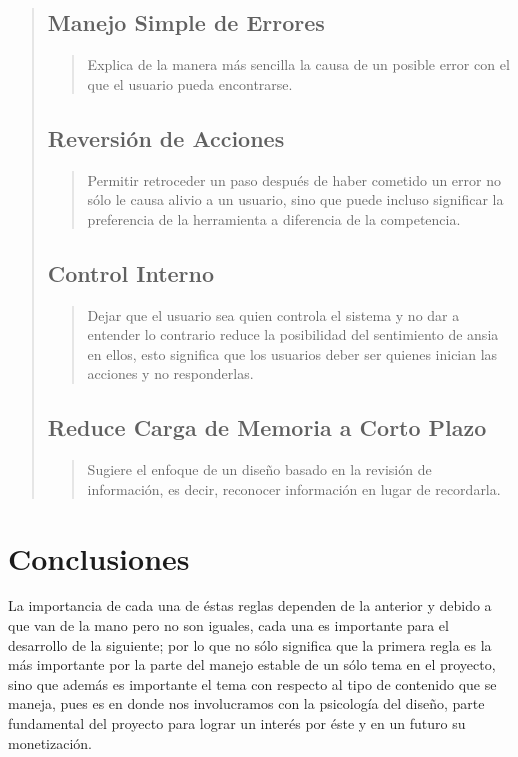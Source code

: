 \documentclass[14pt]{article}
\begin{document}
\begin{quote}
            \subsection*{Manejo Simple de Errores}
                \begin{quote}
                    Explica de la manera más sencilla la causa de un posible error con el que el usuario pueda encontrarse.
                \end{quote}
            \subsection*{Reversión de Acciones}
                \begin{quote}
                    Permitir retroceder un paso después de haber cometido un error no sólo le causa alivio a un usuario, sino que puede incluso significar la preferencia de la herramienta a diferencia de la competencia.
                \end{quote}
            \subsection*{Control Interno}
                \begin{quote}
                    Dejar que el usuario sea quien controla el sistema y no dar a entender lo contrario reduce la posibilidad del sentimiento de ansia en ellos, esto significa que los usuarios deber ser quienes inician las acciones y no responderlas.
                \end{quote}
            \subsection*{Reduce Carga de Memoria a Corto Plazo}
                \begin{quote}
                    Sugiere el enfoque de un diseño basado en la revisión de información, es decir, reconocer información en lugar de recordarla.
                \end{quote}
        \end{quote}
        
    \newpage
    
    \section*{\center Conclusiones}
        \vspace*{1cm}
            La importancia de cada una de éstas reglas dependen de la anterior y debido a que van de la mano pero no son iguales, cada una es importante para el desarrollo de la siguiente; por lo que no sólo significa que la primera regla es la más importante por la parte del manejo estable de un sólo tema en el proyecto, sino que además es importante el tema con respecto al tipo de contenido que se maneja, pues es en donde nos involucramos con la psicología del diseño, parte fundamental del proyecto para lograr un interés por éste y en un futuro su monetización.
    \vspace*{2cm}
\end{document}
